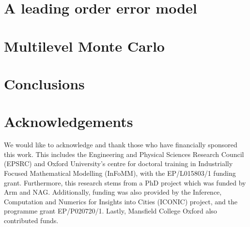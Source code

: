 \documentclass[manuscript,review]{acmart}
\begin{document}
\section{A leading order error model}
\label{sec:a_leading_order_error_model}

\section{Multilevel Monte Carlo}
\label{sec:multilevel_monte_carlo}

\section{Conclusions}
\label{sec:conclusions}

\section{Acknowledgements}
\label{sec:acknowledgements}

We would like to acknowledge and thank those who have financially sponsored this work. This includes the Engineering and Physical Sciences Research Council (EPSRC) and Oxford University's centre for doctoral training in Industrially Focused Mathematical Modelling (InFoMM), with the EP/L015803/1 funding grant. Furthermore, this research stems from a PhD project \citep{sheridan2020nested} which was funded by Arm and NAG. Additionally, funding was also provided by the Inference, Computation and Numerics for Insights into Cities (ICONIC) project, and the programme grant EP/P020720/1. Lastly, Mansfield College Oxford also contributed funds.  



\end{document}
